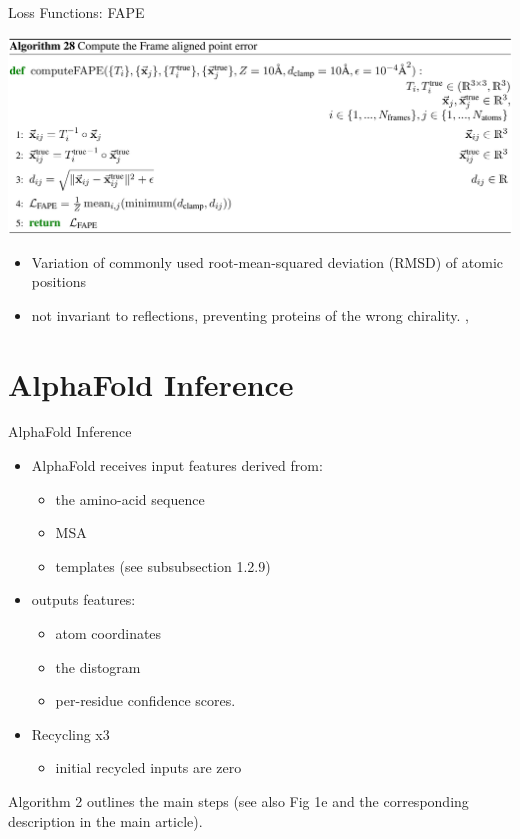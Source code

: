 \documentclass[presentation, smaller]{beamer}
\begin{document}
\begin{frame}[label={sec:org3486362}]{Loss Functions: FAPE}
\begin{center}
\includegraphics[width=.9\linewidth]{./imgs/fape-algo.png}
\end{center}
\cite{jumperHighlyAccurateProtein2021}

\begin{itemize}
\item Variation of commonly used root-mean-squared deviation (RMSD) of atomic positions
\item not invariant to reflections, preventing proteins of the wrong chirality. \cite{rubieraAlphaFoldHereWhat}, \cite{jumperHighlyAccurateProtein2021}
\end{itemize}
\end{frame}

\section*{AlphaFold Inference}
\label{sec:org9bad96d}
\begin{frame}[label={sec:orgaec583a}]{AlphaFold Inference \cite{jumperHighlyAccurateProtein2021}}
\begin{itemize}
\item AlphaFold receives input features derived from:
\begin{itemize}
\item the amino-acid sequence
\item MSA
\item templates (see subsubsection 1.2.9)
\end{itemize}
\item outputs features:
\begin{itemize}
\item atom coordinates
\item the distogram
\item per-residue confidence scores.
\end{itemize}
\item Recycling x3
\begin{itemize}
\item initial recycled inputs are zero
\end{itemize}
\end{itemize}

Algorithm 2 outlines the main steps (see also Fig 1e and the corresponding description in the main article).
\end{frame}
\end{document}

